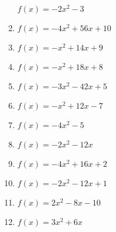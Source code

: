 \documentclass{article}%
\begin{document}
\begin{enumerate}[label=\alph*)]
\newline\vspace{0.5cm} $f(x)=-2x^2 - 3$%
\item%
\newline\vspace{0.5cm} $f(x)=-4x^2 + 56x + 10$%
\item%
\newline\vspace{0.5cm} $f(x)=-x^2 + 14x + 9$%
\item%
\newline\vspace{0.5cm} $f(x)=-x^2 + 18x + 8$%
\item%
\newline\vspace{0.5cm} $f(x)=-3x^2 - 42x + 5$%
\item%
\newline\vspace{0.5cm} $f(x)=-x^2 + 12x - 7$%
\item%
\newline\vspace{0.5cm} $f(x)=-4x^2 - 5$%
\item%
\newline\vspace{0.5cm} $f(x)=-2x^2 - 12x$%
\item%
\newline\vspace{0.5cm} $f(x)=-4x^2 + 16x + 2$%
\item%
\newline\vspace{0.5cm} $f(x)=-2x^2 - 12x + 1$%
\item%
\newline\vspace{0.5cm} $f(x)=2x^2 - 8x - 10$%
\item%
\newline\vspace{0.5cm} $f(x)=3x^2 + 6x$%
\end{enumerate}

%
\end{document}
